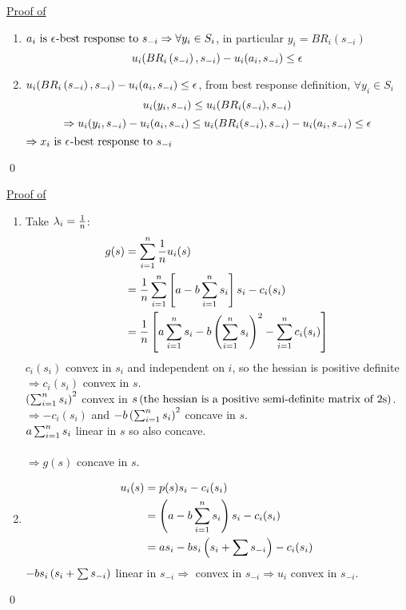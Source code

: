 \documentclass[11pt]{article}
\theoremstyle{definition}
\theoremstyle{definition}
\begin{document}
\underline{Proof of }
	\begin{enumerate}
		\item
			$a_i \text{ is } \epsilon^{}\text{-best response} \text{ to } s_{-i} \Rightarrow \forall y_i \in S_i$, in particular $y_i = BR_i(s_{-i})$
			$$u_i (BR_i \left( s_{-i} \right),s_{-i}) - u_i (a_i,s_{-i}) \leq \epsilon$$

		\item
			$u_i (BR_i \left( s_{-i} \right),s_{-i}) - u_i (a_i,s_{-i}) \leq \epsilon$, from best response definition, $\forall y_i \in S_i$
			$$u_i (y_i,s_{-i}) \leq u_i (BR_i(s_{-i}),s_{-i})$$
			$$\Rightarrow u_i (y_i,s_{-i}) - u_i (a_i,s_{-i}) \leq u_i (BR_i(s_{-i}),s_{-i}) - u_i (a_i,s_{-i}) \leq \epsilon$$
			$\Rightarrow x_i \text{ is } \epsilon^{}\text{-best response} \text{ to } s_{-i}$


	\end{enumerate}
	\qed






\underline{Proof of }
	\begin{enumerate}
		\item
			Take $\lambda_i = \frac{1}{n}$:
			\begin{align*}
				g(s) & = \sum_{i=1}^n \frac{1}{n} u_i(s)\\
				     & = \frac{1}{n} \sum_{i=1}^n \left[ a - b \sum_{i=1}^n s_i \right]s_i - c_i(s_i)\\
				     & = \frac{1}{n} \left[  a \sum_{i=1}^n s_i - b \left( \sum_{i=1}^n s_i \right)^2 - \sum_{i=1}^n c_i(s_i) \right]
			\end{align*}
			$c_i(s_i)$ convex in $s_i$ and independent on $i$, so the hessian is positive definite $\Rightarrow c_i(s_i)$ convex in $s$.\\
			$\left( \sum_{i=1}^n s_i \right)^2$ convex in $s \left( \text{the hessian is a positive semi-definite matrix of 2s} \right)$.\\
			$\Rightarrow -c_i(s_i)$ and $-b\left( \sum_{i=1}^n s_i \right)^2$ concave in $s$.\\
			$a\sum_{i=1}^n s_i$ linear in $s$ so also concave.\\\\
			$\Rightarrow g(s)$ concave in $s$.
		\item
			\begin{align*}
				u_i(s) & = p(s)s_i - c_i(s_i)\\
				       & = \left( a - b\sum_{i=1}^n s_i \right)s_i - c_i(s_i)\\
				       & = as_i - b s_i \left( s_i + \sum s_{-i} \right) - c_i(s_i)
			\end{align*}
			$-bs_i \left( s_i + \sum s_{-i} \right)$ linear in $s_{-i} \Rightarrow$ convex in $s_{-i} \Rightarrow u_i$ convex in $s_{-i}$.
	\end{enumerate}
	\qed
\end{document}
